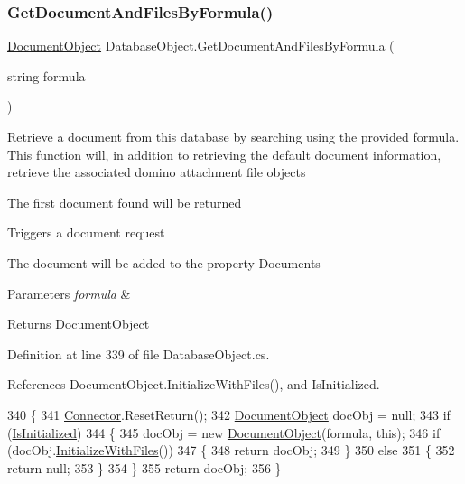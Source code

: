 \subsubsection{\texorpdfstring{Get\+Document\+And\+Files\+By\+Formula()}{GetDocumentAndFilesByFormula()}}
{\footnotesize\ttfamily \mbox{\hyperlink{class_document_object}{Document\+Object}} Database\+Object.\+Get\+Document\+And\+Files\+By\+Formula (\begin{DoxyParamCaption}\item[{string}]{formula }\end{DoxyParamCaption})}



Retrieve a document from this database by searching using the provided formula. This function will, in addition to retrieving the default document information, retrieve the associated domino attachment file objects 

The first document found will be returned

Triggers a document request

The document will be added to the property \textquotesingle{}Documents\textquotesingle{}


\begin{DoxyParams}{Parameters}
{\em formula} & \\
\hline
\end{DoxyParams}
\begin{DoxyReturn}{Returns}
\mbox{\hyperlink{class_document_object}{Document\+Object}}
\end{DoxyReturn}


Definition at line 339 of file Database\+Object.\+cs.



References Document\+Object.\+Initialize\+With\+Files(), and Is\+Initialized.


\begin{DoxyCode}
340     \{
341         \mbox{\hyperlink{class_connector}{Connector}}.ResetReturn();
342         \mbox{\hyperlink{class_document_object}{DocumentObject}} docObj = null;
343         \textcolor{keywordflow}{if} (\mbox{\hyperlink{class_database_object_a5fe036d32a30eb10d1b3f6a30263f740}{IsInitialized}})
344         \{
345             docObj = \textcolor{keyword}{new} \mbox{\hyperlink{class_document_object}{DocumentObject}}(formula, \textcolor{keyword}{this});
346             \textcolor{keywordflow}{if} (docObj.\mbox{\hyperlink{class_document_object_a83f0e855adc5fb7afd02d2e34767f5c8}{InitializeWithFiles}}())
347             \{
348                 \textcolor{keywordflow}{return} docObj;
349             \}
350             \textcolor{keywordflow}{else}
351             \{
352                 \textcolor{keywordflow}{return} null;
353             \}
354         \}
355         \textcolor{keywordflow}{return} docObj;
356     \}
\end{DoxyCode}
\mbox{\label{class_database_object_a30968034c65328e44ddb0fdac8ab1435}} 
